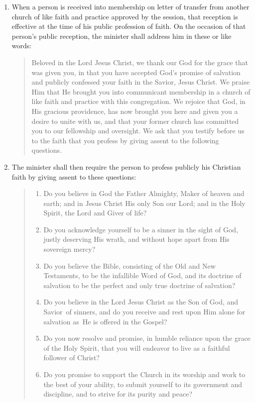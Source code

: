 \documentclass[
]{book}
\providecommand{\tightlist}{%
  \setlength{\itemsep}{0pt}\setlength{\parskip}{0pt}}
\begin{document}
\begin{enumerate}
\def\labelenumi{\arabic{enumi}.}
\item
  \protect\hypertarget{65}{\href{}{}}When a person is received into membership on letter of transfer from another church of like faith and practice approved by the session, that reception is effective at the time of his public profession of faith. On the occasion of that person's public reception, the minister shall address him in these or like words:

  \begin{quote}
  Beloved in the Lord Jesus Christ, we thank our God for the grace that was given you, in that you have accepted God's promise of salvation and publicly confessed your faith in the Savior, Jesus Christ. We praise Him that He brought you into communicant membership in a church of like faith and practice with this congregation. We rejoice that God, in His gracious providence, has now brought you here and given you a desire to unite with us, and that your former church has committed you to our fellowship and oversight. We ask that you testify before us to the faith that you profess by giving assent to the following questions.
  \end{quote}
\item
  The minister shall then require the person to profess publicly his Christian faith by giving assent to these questions:

  \begin{quote}
  \begin{enumerate}
  \def\labelenumii{(\arabic{enumii})}
  \tightlist
  \item
    Do you believe in God the Father Almighty, Maker of heaven and earth; and in Jesus Christ His only Son our Lord; and in the Holy Spirit, the Lord and Giver of life?
  \item
    Do you acknowledge yourself to be a sinner in the sight of God, justly deserving His wrath, and without hope apart from His sovereign mercy?
  \item
    Do you believe the Bible, consisting of the Old and New Testaments, to be the infallible Word of God, and its doctrine of salvation to be the perfect and only true doctrine of salvation?
  \item
    Do you believe in the Lord Jesus Christ as the Son of God, and Savior~of sinners, and do you receive and rest upon Him alone for salvation as~He is offered in the Gospel?
  \item
    Do you now resolve and promise, in humble reliance upon the grace of the Holy Spirit, that you will endeavor to live as a faithful follower of Christ?
  \item
    Do you promise to support the Church in its worship and work to the best of your ability, to submit yourself to its government and discipline, and to strive for its purity and peace?
  \end{enumerate}
  \end{quote}


\end{enumerate}
\end{document}
